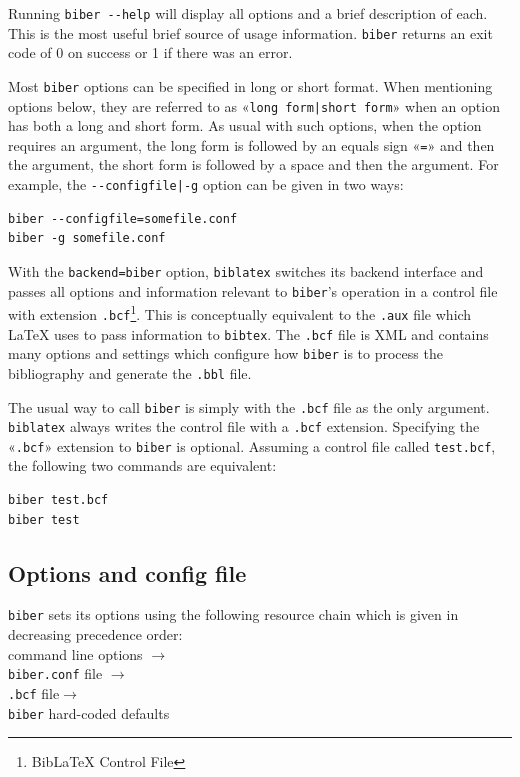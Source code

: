 \documentclass{ltxdockit}
\begin{document}
Running \verb+biber --help+ will display all options and a brief
description of each. This is the most useful brief source of usage
information. \verb+biber+ returns an exit code of 0 on success or 1 if
there was an error.

Most \verb+biber+ options can be specified in long or short format. When
mentioning options below, they are referred to as
«\verb+long form|short form+» when an option has both a long and short
form. As usual with such options, when the option requires an argument, the
long form is followed by an equals sign «\verb+=+» and then the argument,
the short form is followed by a space and then the argument. For example,
the \verb+--configfile|-g+ option can be given in two ways:

\begin{verbatim}
biber --configfile=somefile.conf
biber -g somefile.conf
\end{verbatim}

With the \verb+backend=biber+ option, \verb+biblatex+ switches its backend
interface and passes all options and information relevant to \verb+biber+'s
operation in a control file with extension \verb+.bcf+\footnote{BibLaTeX Control
  File}. This is conceptually equivalent to the \verb+.aux+ file which
LaTeX uses to pass information to \verb+bibtex+. The \verb+.bcf+ file is
XML and contains many options and settings which configure how \verb+biber+
is to process the bibliography and generate the \verb+.bbl+ file.

The usual way to call \verb+biber+ is simply with the \verb+.bcf+ file
as the only argument. \verb+biblatex+ always writes the control file with
a \verb+.bcf+ extension. Specifying the «\verb+.bcf+» extension to
\verb+biber+ is optional. Assuming a control file called
\verb+test.bcf+, the following two commands are equivalent:

\begin{verbatim}
biber test.bcf
biber test
\end{verbatim}

\subsection{Options and config file}
\verb+biber+ sets its options using the following resource 
chain which is given in decreasing precedence order:\\[2ex]

\noindent command line options $\rightarrow$\\
\hspace*{1em}\verb+biber.conf+ file $\rightarrow$\\
\hspace*{2em}\verb+.bcf+ file$\rightarrow$\\
\hspace*{3em}\verb+biber+ hard-coded defaults\\[2ex]
\end{document}
